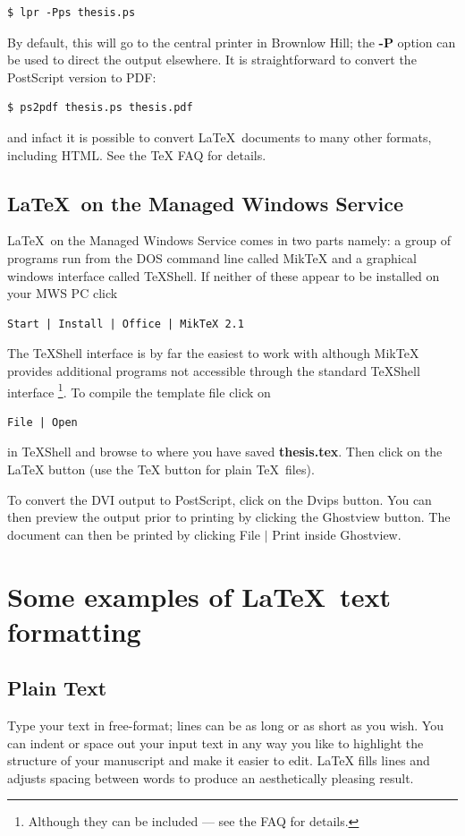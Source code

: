 \documentclass[11pt,oneside]{book}
\begin{document}
\begin{verbatim}
$ lpr -Pps thesis.ps
\end{verbatim}


By default, this will go to the central printer in Brownlow Hill;
the {\bf -P} option can be used to direct the output elsewhere. It is 
straightforward to convert the PostScript version to PDF:

\begin{verbatim}
$ ps2pdf thesis.ps thesis.pdf
\end{verbatim}

and infact it is possible to convert \LaTeX \ documents to many other formats, including
HTML. See the TeX FAQ for details.


\subsection{\LaTeX \ on the Managed Windows Service}
\LaTeX \ on the Managed Windows Service comes in two parts namely:
a group of programs run from the DOS command line called MikTeX
and a graphical windows interface called TeXShell. If neither
of these appear to be installed on your MWS PC click

\begin{verbatim}
Start | Install | Office | MikTeX 2.1
\end{verbatim}

The TeXShell interface is by far the easiest to work with although
MikTeX provides additional programs not accessible through
the standard TeXShell interface
\footnote
{Although they can be included --- see the FAQ for details.}.
To compile the template file click on 
\begin{verbatim}
File | Open
\end{verbatim}
in TeXShell and browse to where you have saved {\bf thesis.tex}.
Then click on the LaTeX button (use the TeX button for plain \TeX \ files).

To convert the DVI output
to PostScript, click on the Dvips button. You can then 
preview the output prior to printing by clicking the
Ghostview button. The document can then be printed
by clicking File $|$ Print inside Ghostview.

\section{Some examples of \LaTeX \ text formatting}

\subsection {Plain Text}
Type your text in free-format; lines can be as long
or as short
as you wish.
        You can indent         or space out
        your input 
            text in 
                any way you like to highlight the structure
        of your manuscript and make it easier to edit.
LaTeX fills lines and adjusts spacing between words to produce an
aesthetically pleasing result.
\end{document}
